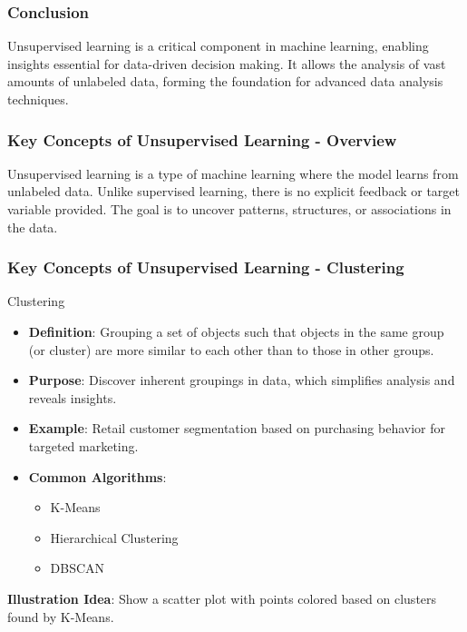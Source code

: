 \documentclass[aspectratio=169]{beamer}
\begin{document}
\begin{frame}[fragile]
    \frametitle{Conclusion}
    Unsupervised learning is a critical component in machine learning, enabling insights essential for data-driven decision making. It allows the analysis of vast amounts of unlabeled data, forming the foundation for advanced data analysis techniques.
\end{frame}

\begin{frame}[fragile]
    \frametitle{Key Concepts of Unsupervised Learning - Overview}
    Unsupervised learning is a type of machine learning where the model learns from unlabeled data. Unlike supervised learning, there is no explicit feedback or target variable provided. The goal is to uncover patterns, structures, or associations in the data.
\end{frame}

\begin{frame}[fragile]
    \frametitle{Key Concepts of Unsupervised Learning - Clustering}
    \begin{block}{Clustering}
        \begin{itemize}
            \item \textbf{Definition}: Grouping a set of objects such that objects in the same group (or cluster) are more similar to each other than to those in other groups.
            \item \textbf{Purpose}: Discover inherent groupings in data, which simplifies analysis and reveals insights.
            \item \textbf{Example}: Retail customer segmentation based on purchasing behavior for targeted marketing.
            \item \textbf{Common Algorithms}: 
                \begin{itemize}
                    \item K-Means
                    \item Hierarchical Clustering
                    \item DBSCAN
                \end{itemize}
        \end{itemize}
    \end{block}
    \textbf{Illustration Idea}: Show a scatter plot with points colored based on clusters found by K-Means.
\end{frame}
\end{document}
